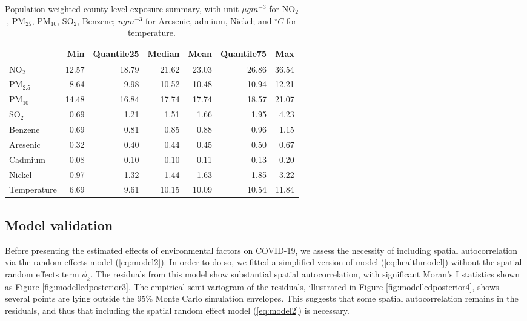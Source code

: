 \documentclass[12,]{article}
\begin{document}
\begin{table}

\caption{\label{tab:dataTable}Population-weighted county level exposure summary, with unit $\mu g m^{-3}$ for NO$_2$, PM$_{25}$, PM$_{10}$, SO$_2$, Benzene; $ng m^{-3}$ for Aresenic, admium, Nickel; and $^{\circ}C$  for temperature.}
\centering
\begin{tabular}[t]{lrrrrrr}
\toprule
 & \textbf{Min} & \textbf{Quantile25} & \textbf{Median} & \textbf{Mean} & \textbf{Quantile75} & \textbf{Max}\\
\midrule
NO$_2$ & 12.57 & 18.79 & 21.62 & 23.03 & 26.86 & 36.54\\
PM$_{2.5}$ & 8.64 & 9.98 & 10.52 & 10.48 & 10.94 & 12.21\\
PM$_{10}$ & 14.48 & 16.84 & 17.74 & 17.74 & 18.57 & 21.07\\
SO$_2$ & 0.69 & 1.21 & 1.51 & 1.66 & 1.95 & 4.23\\
Benzene & 0.69 & 0.81 & 0.85 & 0.88 & 0.96 & 1.15\\
Aresenic & 0.32 & 0.40 & 0.44 & 0.45 & 0.50 & 0.67\\
Cadmium & 0.08 & 0.10 & 0.10 & 0.11 & 0.13 & 0.20\\
Nickel & 0.97 & 1.32 & 1.44 & 1.63 & 1.85 & 3.22\\
Temperature & 6.69 & 9.61 & 10.15 & 10.09 & 10.54 & 11.84\\
\bottomrule
\end{tabular}
\end{table}

\hypertarget{model-validation}{%
\subsection{Model validation}\label{model-validation}}

Before presenting the estimated effects of environmental factors on
COVID-19, we assess the necessity of including spatial autocorrelation
via the random effects model (\ref{eq:model2}). In order to do so, we
fitted a simplified version of model (\ref{eq:healthmodel}) without the
spatial random effects term \(\phi_k\). The residuals from this model
show substantial spatial autocorrelation, with significant Moran's I
statistics \autocite{Moran1950} shown as Figure
\ref{fig:modelledposterior3}. The empirical semi-variogram of the
residuals, illustrated in Figure \ref{fig:modelledposterior4}, shows
several points are lying outside the 95\% Monte Carlo simulation
envelopes. This suggests that some spatial autocorrelation remains in
the residuals, and thus that including the spatial random effect model
(\ref{eq:model2}) is necessary.
\end{document}
